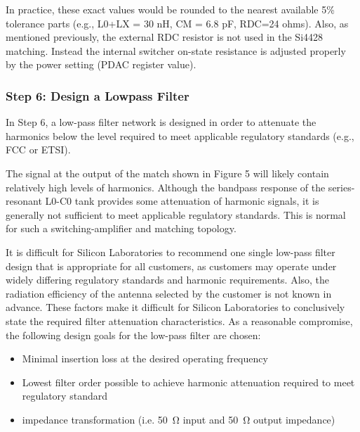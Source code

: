         In practice, these exact values would be rounded to the nearest available 5\% tolerance 
        parts (e.g., L0+LX = 30 nH, CM = 6.8 pF, RDC=24 ohms). Also, as mentioned previously, the 
        external RDC resistor is not used in the Si4428 matching. Instead the internal switcher 
        on-state resistance is adjusted properly by the power setting (PDAC register value).
        
      \subsubsection{Step 6: Design a Lowpass Filter}
        In Step 6, a low-pass filter network is designed in order to attenuate the harmonics below 
        the level required to meet applicable regulatory standards (e.g., FCC or ETSI).
        
        The signal at the output of the match shown in Figure 5 will likely contain relatively high 
        levels of harmonics. Although the bandpass response of the series-resonant L0-C0 tank 
        provides some attenuation of harmonic signals, it is generally not sufficient to meet 
        applicable regulatory standards. This is normal for such a switching-amplifier and matching 
        topology.
        
        It is difficult for Silicon Laboratories to recommend one single low-pass filter design 
        that is appropriate for all customers, as customers may operate under widely differing 
        regulatory standards and harmonic requirements. Also, the radiation efficiency of the 
        antenna selected by the customer is not known in advance. These factors make it difficult 
        for Silicon Laboratories to conclusively state the required filter attenuation 
        characteristics. As a reasonable compromise, the following 
        design goals for the low-pass filter are chosen:
        \begin{itemize}\addtolength{\itemsep}{-0.5\baselineskip}
          \item Minimal insertion loss at the desired operating frequency
          \item Lowest filter order possible to achieve harmonic attenuation required to meet 
                regulatory standard
          \item impedance transformation (i.e. \SI{50}{\ohm} input and \SI{50}{\ohm} output 
                impedance)          
        \end{itemize}
        
